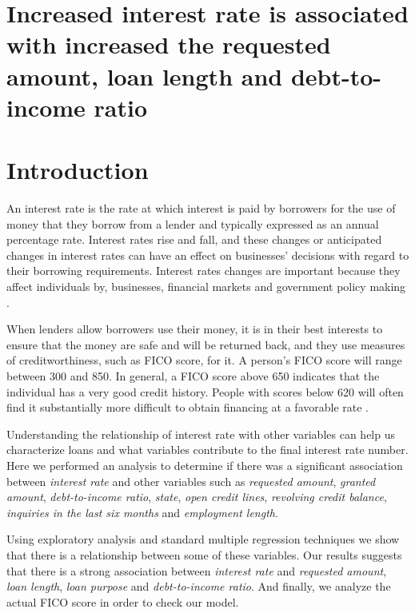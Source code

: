 \documentclass[a4paper,12pt]{extarticle}
\begin{document}
\section*{Increased interest rate is associated with increased the requested amount, loan length and
debt-to-income ratio}

\section{Introduction}

An interest rate is the rate at which interest is paid by borrowers for the use of money that they borrow from a lender \cite{source:wiki.interestrate} and typically expressed as an annual percentage rate. Interest rates rise and fall, and these changes or anticipated changes in interest rates can have an effect on businesses' decisions with regard to their borrowing requirements. Interest rates changes are important because they affect individuals by, businesses, financial markets and government policy making \cite{source:ehow.importance2}.

When lenders allow borrowers use their money, it is in their best interests to ensure that the money are safe and will be returned back, and they use measures of creditworthiness, such as FICO score, for it. A person's FICO score will range between 300 and 850. In general, a FICO score above 650 indicates that the individual has a very good credit history. People with scores below 620 will often find it substantially more difficult to obtain financing at a favorable rate \cite{source:ficoscore}.

Understanding the relationship of interest rate with other variables can help us characterize loans and what variables contribute to the final interest rate number. Here we performed an analysis to determine if there was a significant association between \emph{interest rate} and other variables such as \emph{requested amount}, \emph{granted amount}, \emph{debt-to-income ratio}, \emph{state}, \emph{open credit lines}, \emph{revolving credit balance}, \emph{inquiries in the last six months} and \emph{employment length}.

Using exploratory analysis and standard multiple regression techniques we show that there is a relationship between some of these variables. Our results suggests that there is a strong association between \emph{interest rate} and \emph{requested amount}, \emph{loan length}, \emph{loan purpose} and \emph{debt-to-income ratio}. And finally, we analyze the actual FICO score in order to check our model.
\end{document}
